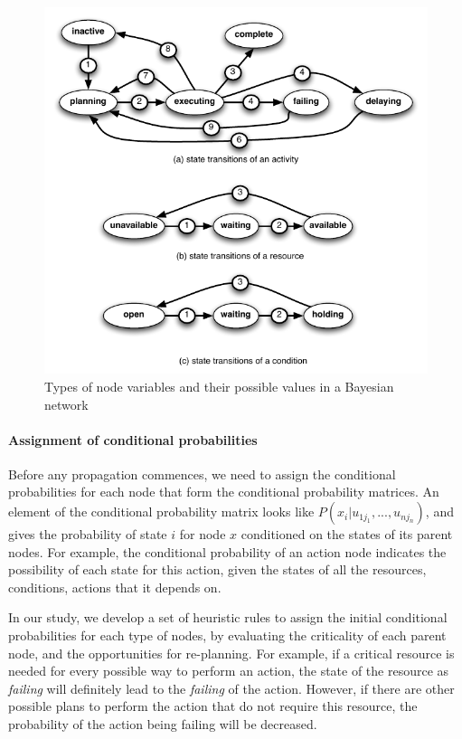 \begin{figure}[htbp] %
	\centering
	\includegraphics{state_transitions.pdf} 
	\caption{Types of node variables and their possible values in a Bayesian network}
	\label{fig:state_transitions}
\end{figure}
\paragraph*{Assignment of conditional probabilities} %
\label{par:assignment_of_conditional_probabilities}
Before any propagation commences, we need to assign the conditional probabilities for each node that form the conditional probability matrices. An element of the conditional probability matrix looks like $P(x_i|u_{1j_1}, ..., u_{nj_n})$, and gives the probability of state $i$ for node $x$ conditioned on the states of its parent nodes. For example, the conditional probability of an action node indicates the possibility of each state for this action, given the states of all the resources, conditions, actions that it depends on. 


In our study, we develop a set of heuristic rules to assign the initial conditional probabilities for each type of nodes, by evaluating the criticality of each parent node, and the opportunities for re-planning. For example, if a critical resource is needed for every possible way to perform an action, the state of the resource as \emph{failing} will definitely lead to the \emph{failing} of the action. However, if there are other possible plans to perform the action that do not require this resource, the probability of the action being failing will be decreased.

